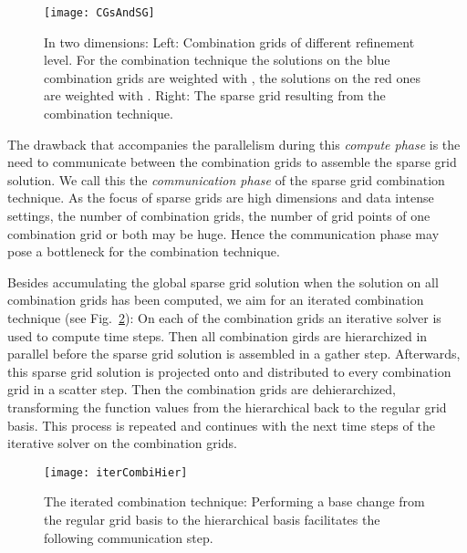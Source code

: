 \documentclass[letterpaper]{article}
\newcommand{\mypar}[1]{{\bf #1.}}
\begin{document}
			\begin{figure}[htbp]
				\texttt{[image: CGsAndSG]}
				\caption{In two dimensions: Left: Combination grids of different refinement level. For the combination technique the solutions on the blue combination grids are weighted with , the solutions on the red ones are weighted with . Right: The sparse grid resulting from the combination technique.}
				\label{fig:CGsAndSG}
			\end{figure}

			The drawback that accompanies the parallelism during this \emph{compute phase} is the need to communicate between the combination grids to assemble the sparse grid solution. We call this the \emph{communication phase} of the sparse grid combination technique. As the focus of sparse grids are high dimensions and data intense settings, the number of combination grids, the number of grid points of one combination grid or both may be huge. Hence the communication phase may pose a bottleneck for the combination technique.



		\noindent \mypar{The Iterated Combination Technique}
Besides accumulating the global sparse grid solution when the solution on all combination grids has been computed, we aim for an iterated combination technique \cite{griebel96numericalTurbulence} (see Fig.~\ref{fig:iterCombiHier}):
On each of the combination grids an iterative solver is used to compute  time steps. Then all combination girds are hierarchized in parallel before the sparse grid solution is assembled in a gather step. Afterwards, this sparse grid solution is projected onto and distributed to every combination grid in a scatter step. Then the combination grids are dehierarchized, transforming the function values from the hierarchical back to the regular grid basis.  This process is repeated and continues with the next  time steps of the iterative solver on the combination grids. 
\begin{figure}[htbp]\centering
				\texttt{[image: iterCombiHier]}
				\caption{The iterated combination technique: Performing a base change from the regular grid basis to the hierarchical basis facilitates the following communication step.}
				\label{fig:iterCombiHier}
			\end{figure}
\end{document}
